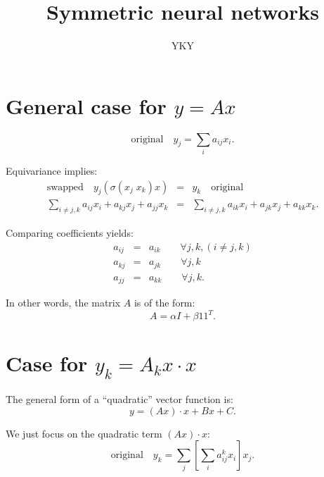 

\title{Symmetric neural networks}
\author{YKY}


\maketitle

\section{General case for $y = A x$}

\begin{equation}
\boxed{\mbox{original}} \quad y_j = \sum_i a_{ij} x_i .
\end{equation}

Equivariance implies:
\begin{eqnarray}
\boxed{\mbox{swapped}} \quad y_j ( \sigma(x_j \; x_k) x) &=& y_k \quad \boxed{\mbox{original}} \\
\sum_{i \neq j,k} a_{ij} x_i + a_{kj} x_j + a_{jj} x_k &=& \sum_{i \neq j,k} a_{ik} x_i + a_{jk} x_j + a_{kk} x_k . \nonumber
\end{eqnarray}


Comparing coefficients yields:
\begin{eqnarray}
a_{ij} &=& a_{ik} \quad \quad \forall j, k, (i \neq j, k) \nonumber \\
a_{kj} &=& a_{jk} \quad \quad \forall j, k \nonumber \\
a_{jj} &=& a_{kk} \quad \quad \forall j, k .
\end{eqnarray}

In other words, the matrix $A$ is of the form:
\begin{equation}
A = \alpha I + \beta 1 1^T .
\end{equation}

\section{Case for $y_k = A_k x \cdot x$}

The general form of a ``quadratic'' vector function is:
\begin{equation}
y = (A x) \cdot x + B x + C .
\end{equation}

We just focus on the quadratic term $(A x) \cdot x$:
\begin{equation}
\boxed{\mbox{original}} \quad y_k = \sum_j \left[ \sum_i a_{ij}^k x_i \right] x_j .
\end{equation}

